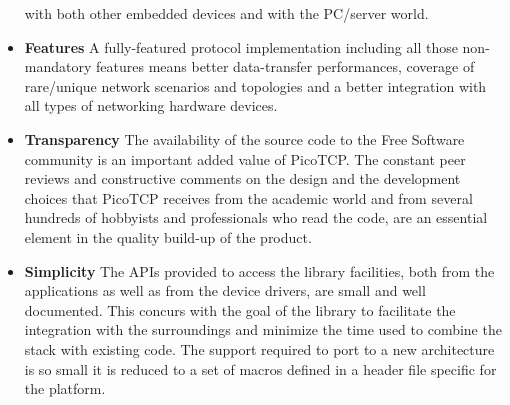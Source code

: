 \begin{itemize}
with both other embedded devices and with the PC/server world.
\item \textbf{Features} A fully-featured protocol implementation including all those non-mandatory
features means better data-transfer performances, coverage of rare/unique 
network scenarios and topologies and a better integration with all types of
networking hardware devices.
\item \textbf{Transparency} The availability of the source code to the Free
Software community is an important added value of PicoTCP. 
The constant peer reviews and constructive comments on the
design and the development choices that PicoTCP receives from the academic world
and from several hundreds of hobbyists and  professionals who read the code,
are an essential element in the quality build-up of the product.
\item \textbf{Simplicity} The APIs provided to access the library
facilities, both from the applications as well as from the device drivers, are
small and well documented. This concurs with the goal of the library to facilitate
the integration with the surroundings and minimize the time used to combine
the stack with existing code. The support required to port to a new
architecture is so small it is reduced to a set of macros defined in a
header file specific for the platform.
\end{itemize}


